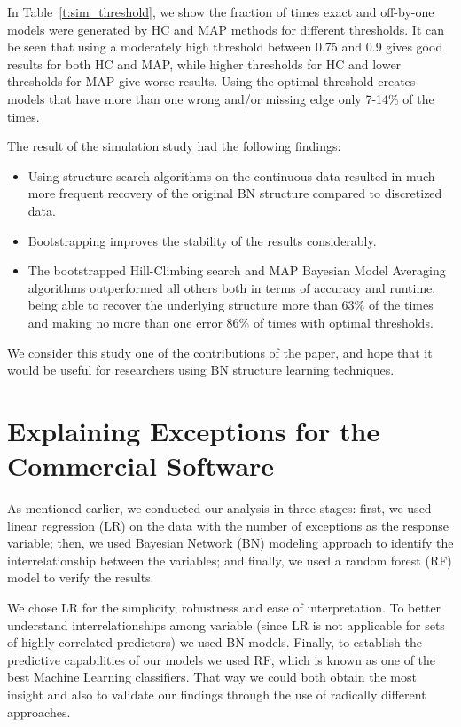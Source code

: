 \documentclass[smallextended]{svjour3}       %
\begin{document}
In Table~\ref{t:sim_threshold}, we show the fraction of times exact and 
off-by-one models were generated by HC and MAP methods for different thresholds. 
It can be seen that using a moderately high threshold between 0.75 and 0.9 gives
good results for both HC and MAP, while higher thresholds for HC and lower thresholds for MAP
give worse results. Using the optimal threshold creates models that have more than one wrong 
and/or missing edge only 7-14\% of the times. 

The result of the simulation study had the following findings:
\begin{itemize}
\item Using structure search algorithms on the continuous data resulted in much more frequent recovery of the original BN structure compared to discretized data.
\item Bootstrapping  improves the stability of the results considerably.
\item The bootstrapped Hill-Climbing search and MAP Bayesian Model Averaging algorithms outperformed all others both in terms of accuracy and runtime, being able to recover the underlying structure more than 63\% of the times and making no more than one error 86\% of times with optimal thresholds. 
\end{itemize}

We consider this study one of the contributions of the paper, and hope that it 
would be useful for researchers using BN structure learning techniques.

\section{Explaining Exceptions for the Commercial Software}\label{s:explain}
As mentioned earlier, we conducted our analysis in three stages: first, we used linear regression (LR) on the data with the number of exceptions as the response variable; then, we used Bayesian Network (BN) modeling approach to identify the interrelationship between the variables; and finally, we used a random forest (RF) model to verify the results. 

We chose LR for the simplicity, robustness and ease of interpretation. To better understand interrelationships among variable (since LR is not applicable for sets of highly correlated predictors) we used BN models. Finally, to establish the 
predictive capabilities of our models we used RF, which is known as one of the best Machine Learning classifiers. That way we could both obtain the most insight and also to validate our findings through the use of radically different approaches.
\end{document}
